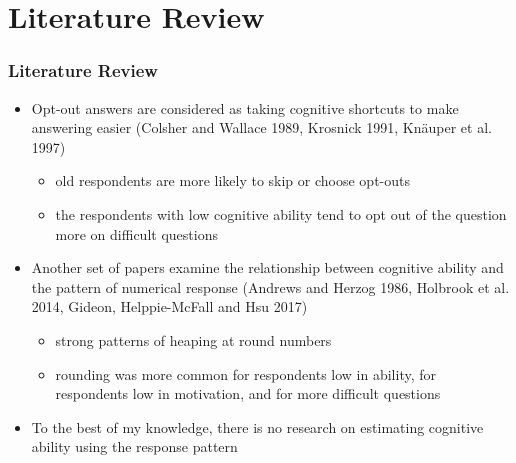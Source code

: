 \documentclass[10pt,svgnames,fragile]{beamer}
\begin{document}
{
	\AtBeginSection{}
	\section{Literature Review}
	\begin{frame}
		\frametitle{Literature Review} 
		\begin{itemize}
			\item Opt-out answers are considered as taking cognitive shortcuts to make answering easier (Colsher and Wallace 1989, Krosnick 1991, Kn{\"a}uper et al. 1997)
			\begin{itemize}
				\vfill
				\item old respondents are more likely to skip or choose opt-outs
				\item the respondents with low cognitive ability tend to opt out of the question more on difficult questions
							\end{itemize}
			\vfill
			\item Another set of papers examine the relationship between cognitive ability and the pattern of numerical response (Andrews and Herzog 1986, Holbrook et al. 2014, Gideon, Helppie-McFall and Hsu 2017)
			\vfill
			\begin{itemize}
				\item strong patterns of heaping at round numbers
				\vfill
				\item rounding was more common for respondents low in ability, for respondents low in motivation, and for more difficult questions
			\end{itemize}
			\vfill
						\item To the best of my knowledge, there is no research on estimating cognitive ability using the response pattern
			
		\end{itemize}
	\end{frame}

}
\end{document}
